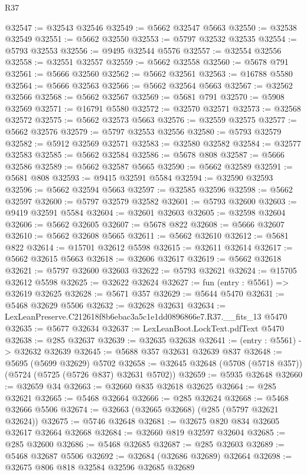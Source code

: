 \begin{lexlean}{R37}
\begin{coremodule}
@32547 := @32543 @32546
@32549 := @5662 @32547 @5663
@32550 := @32538 @32549
@32551 := @5662 @32550
@32553 := @5797 @32532 @32535
@32554 := @5793 @32553
@32556 := @9495 @32544 @5576
@32557 := @32554 @32556
@32558 := @32551 @32557
@32559 := @5662 @32558
@32560 := @5678 @791
@32561 := @5666 @32560
@32562 := @5662 @32561
@32563 := @16788 @5580
@32564 := @5666 @32563
@32566 := @5662 @32564 @5663
@32567 := @32562 @32566
@32568 := @5662 @32567
@32569 := @5681 @791
@32570 := @5908 @32569
@32571 := @16791 @5580
@32572 := @32570 @32571
@32573 := @32568 @32572
@32575 := @5662 @32573 @5663
@32576 := @32559 @32575
@32577 := @5662 @32576
@32579 := @5797 @32553 @32556
@32580 := @5793 @32579
@32582 := @5912 @32569 @32571
@32583 := @32580 @32582
@32584 := @32577 @32583
@32585 := @5662 @32584
@32586 := @5678 @808
@32587 := @5666 @32586
@32589 := @5662 @32587 @5665
@32590 := @5662 @32589
@32591 := @5681 @808
@32593 := @9415 @32591 @5584
@32594 := @32590 @32593
@32596 := @5662 @32594 @5663
@32597 := @32585 @32596
@32598 := @5662 @32597
@32600 := @5797 @32579 @32582
@32601 := @5793 @32600
@32603 := @9419 @32591 @5584
@32604 := @32601 @32603
@32605 := @32598 @32604
@32606 := @5662 @32605
@32607 := @5678 @822
@32608 := @5666 @32607
@32610 := @5662 @32608 @5665
@32611 := @5662 @32610
@32612 := @5681 @822
@32614 := @15701 @32612 @5598
@32615 := @32611 @32614
@32617 := @5662 @32615 @5663
@32618 := @32606 @32617
@32619 := @5662 @32618
@32621 := @5797 @32600 @32603
@32622 := @5793 @32621
@32624 := @15705 @32612 @5598
@32625 := @32622 @32624
@32627 := fun (entry : @5561) => @32619 @32625
@32628 := @5671 @357
@32629 := @5644 @5470
@32631 := @5468 @32629 @5506
@32632 := @32628 @32631
@32634 := LexLeanPreserve.C212618f8b6ebac3a5c1e1dd0896866e7.R37.__fits_13 @5470
@32635 := @5677 @32634
@32637 := LexLeanBoot.LockText.pdfText @5470
@32638 := @285 @32637
@32639 := @32635 @32638
@32641 := (entry : @5561) -> @32632 @32639
@32645 := @5688 @357 @32631 @32639 @837
@32648 := @5695 (@5699 @32629) @5702
@32658 := @32645 @32648 (@5708 (@5718 @357)) (@5724 (@5725 (@5726 @837) @32631 @5702))
@32659 := @5935 @32648
@32660 := @32659 @34
@32663 := @32660 @835 @32618 @32625
@32664 := @285 @32621
@32665 := @5468 @32664
@32666 := @285 @32624
@32668 := @5468 @32666 @5506
@32674 := @32663 (@32665 @32668) (@285 (@5797 @32621 @32624))
@32675 := @5746 @32648
@32681 := @32675 @820 @834 @32605 @32617 @32664 @32668
@32684 := @32660 @819 @32597 @32604
@32685 := @285 @32600
@32686 := @5468 @32685
@32687 := @285 @32603
@32689 := @5468 @32687 @5506
@32692 := @32684 (@32686 @32689) @32664
@32698 := @32675 @806 @818 @32584 @32596 @32685 @32689

\end{coremodule}
\end{lexlean}

